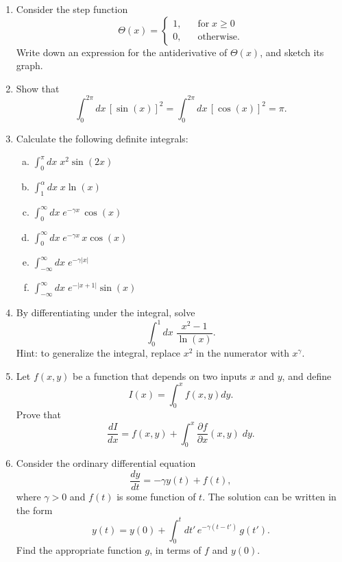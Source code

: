 \documentclass[10pt,a4paper]{article}
\begin{document}
\begin{enumerate}
\item
  Consider the step function
  \begin{equation}
    \Theta(x) = \left\{\begin{array}{ll} 1, &\;\;\;\textrm{for} \; x \ge 0\\ 0,&\;\;\; \textrm{otherwise.}\end{array}\right.
  \end{equation}
  Write down an expression for the antiderivative of $\Theta(x)$, and
  sketch its graph.

\item
  Show that
  \begin{equation}
    \int_0^{2\pi} dx\, [\sin(x)]^2 = \int_0^{2\pi} dx\, [\cos(x)]^2 = \pi.
  \end{equation}

\item
  Calculate the following definite integrals:

  \begin{enumerate}[(a)]
  \item $\displaystyle\int_{0}^\pi dx\; x^2 \sin(2x)$
  \item $\displaystyle\int_{1}^\alpha dx\; x \ln(x)$
  \item $\displaystyle\int_0^\infty dx\;e^{-\gamma x} \, \cos(x)$
  \item $\displaystyle\int_0^\infty dx\;e^{-\gamma x} \, x \cos(x)$
  \item $\displaystyle\int_{-\infty}^\infty dx\;e^{-\gamma |x|}$
  \item $\displaystyle \int_{-\infty}^\infty dx \;e^{-|x+1|} \sin(x)$
  \end{enumerate}

\item
  By differentiating under the integral, solve
  \begin{equation}
    \int_0^1 dx\; \frac{x^2-1}{\ln(x)}.
  \end{equation}
  Hint: to generalize the integral, replace $x^2$ in the numerator
  with $x^\gamma$.

\item
  Let $f(x,y)$ be a function that depends on two inputs $x$ and
  $y$, and define
  \begin{equation}
    I(x) = \int_0^x f(x,y) dy.
  \end{equation}
  Prove that
  \begin{equation}
    \frac{dI}{dx} = f(x,y) + \int_0^x \frac{\partial f}{\partial x}(x,y) \;dy.
  \end{equation}

\item
  Consider the ordinary differential equation
  \begin{equation}
    \frac{dy}{dt} = - \gamma y(t) + f(t),
  \end{equation}
  where $\gamma > 0$ and $f(t)$ is some function of $t$. The solution
  can be written in the form
  \begin{equation}
    y(t) = y(0) + \int_0^t dt' \, e^{-\gamma(t-t')} \, g(t').
  \end{equation}
  Find the appropriate function $g$, in terms of $f$ and $y(0)$.
\end{enumerate}
\end{document}
